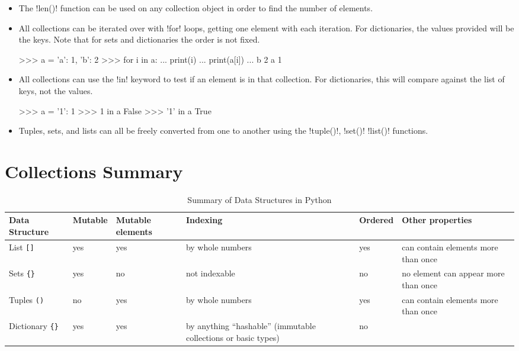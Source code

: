 \documentclass[11pt]{cselabheader}
\begin{document}
\begin{itemize}
\item The \pythoninline!len()! function can be used on any collection object
  in order to find the number of elements.
\item All collections can be iterated over with \pythoninline!for! loops,
  getting one element with each iteration. For dictionaries, the values provided
  will be the keys. Note that for sets and dictionaries the order is not fixed.

  \begin{pyconcode}
>>> a = {'a': 1, 'b': 2}
>>> for i in a:
...     print(i)
...     print(a[i])
... 
b
2
a
1
  \end{pyconcode}

\item All collections can use the \pythoninline!in! keyword to test
  if an element is in that collection. For dictionaries, this will
  compare against the list of keys, not the values.
  \begin{pyconcode}
>>> a = {'1': 1}
>>> 1 in a
False
>>> '1' in a
True
  \end{pyconcode}
\item Tuples, sets, and lists can all be freely converted from one
  to another using the \pythoninline!tuple()!, \pythoninline!set()!
  \pythoninline!list()! functions.
\end{itemize}

\section{Collections Summary}

\begin{table}[!ht]
  \centering
  \begin{tabular}{p{1.6cm}lp{1.6cm}p{3.5cm}lp{4.5cm}}
    \toprule
    Data Structure & Mutable & Mutable elements & Indexing & Ordered
    & Other
    properties\\
    \midrule
    List \lstinline![]! & yes & yes & by whole numbers & yes & can contain elements more than once\\
    Sets \lstinline!{}! & yes & no & not indexable & no & no element can appear more than once\\
    Tuples \lstinline!()! & no & yes & by whole numbers & yes & can contain elements more than
    once\\
    Dictionary \lstinline!{}! & yes & yes & by anything ``hashable'' (immutable collections or
    basic types) & no & \\
    \bottomrule
  \end{tabular}
  \caption{Summary of Data Structures in Python}
  \label{tab:sum}
\end{table}
\end{document}
